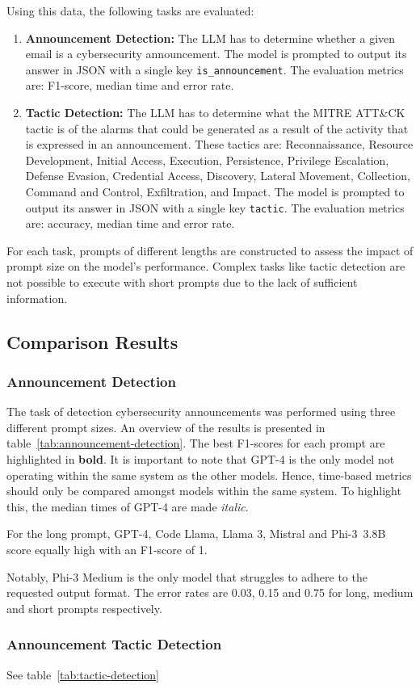 Using this data, the following tasks are evaluated:
\begin{enumerate}
    \item \textbf{Announcement Detection:} The LLM has to determine whether a given email is a cybersecurity
    announcement.
    The model is prompted to output its answer in JSON with a single key \texttt{is\_announcement}.
    The evaluation metrics are: F1-score, median time and error rate.
    \item \textbf{Tactic Detection:} The LLM has to determine what the MITRE ATT\&CK tactic is of the alarms that could
    be generated as a result of the activity that is expressed in an announcement.
    These tactics are: Reconnaissance, Resource Development, Initial Access, Execution, Persistence, Privilege
    Escalation, Defense Evasion, Credential Access, Discovery, Lateral Movement, Collection, Command and Control,
    Exfiltration, and Impact.
    The model is prompted to output its answer in JSON with a single key \texttt{tactic}.
    The evaluation metrics are: accuracy, median time and error rate.
\end{enumerate}

For each task, prompts of different lengths are constructed to assess the impact of prompt size on the model's
performance.
Complex tasks like tactic detection are not possible to execute with short prompts due to the lack of sufficient
information.

\subsection{Comparison Results}
\label{subsec:rq3-comparison-results}

\subsubsection{Announcement Detection}
The task of detection cybersecurity announcements was performed using three different prompt sizes.
An overview of the results is presented in table\ \ref{tab:announcement-detection}.
The best F1-scores for each prompt are highlighted in \textbf{bold}.
It is important to note that GPT-4 is the only model not operating within the same system as the other models.
Hence, time-based metrics should only be compared amongst models within the same system.
To highlight this, the median times of GPT-4 are made \textit{italic}.

For the long prompt, GPT-4, Code Llama, Llama 3, Mistral and Phi-3\ 3.8B score equally high with an F1-score of 1.


Notably, Phi-3 Medium is the only model that struggles to adhere to the requested output format.
The error rates are 0.03, 0.15 and 0.75 for long, medium and short prompts respectively.



\subsubsection{Announcement Tactic Detection}

See table\ \ref{tab:tactic-detection}

